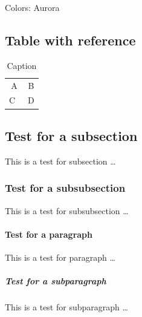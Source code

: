 \noindent
Colors: Aurora \\

\newpage
\subsection{Table with reference}
\begin{table}[]
    \centering
    \caption{Caption}
    \begin{tabular}{c|c}
        A & B \\
        C~\cite{latex} & D
    \end{tabular}
    \label{tab:my_label}
\end{table}

\subsection{Test for a subsection} 
This is a test for subsection \ldots

\subsubsection{Test for a subsubsection}
This is a test for subsubsection \ldots 

\paragraph{Test for a paragraph} 
This is a test for paragraph \ldots

\subparagraph{Test for a subparagraph} 
This is a test for subparagraph \ldots 
